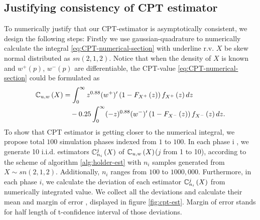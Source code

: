 \subsection{Justifying consistency of CPT estimator}
To numerically justify that our CPT-estimator is asymptotically consistent, we design the following steps:
Firstly we use gaussian-quadrature to numerically calculate the integral \eqref{eq:CPT-numerical-section} with underline r.v. $X$ be skew normal distributed as $sn(2,1,2)$. Notice that when the density of $X$ is known and $w^+(p)$, $w^-(p)$ are differentiable, the CPT-value \eqref{eq:CPT-numerical-section} could be formulated as
\begin{align}
\mathbb{C}_{u,w}\left( X \right) & = \int_0^{\infty} z^{0.88} (w^{+})^\prime \left(1 - F_{X^+}\left(z\right)\right) f_{X^+}\left(z\right)dz \\
&\quad - 0.25 \int_0^{\infty} (-z)^{0.88} (w^{-})^\prime \left(1 - F_{X^-}\left(z\right)\right) f_{X^-}\left(z\right) dz.
\end{align}
To show that CPT estimator is getting closer to the numerical integral, we propose total $100$ simulation phases indexed from $1$ to $100$. In each phase i , we generate 10 i.i.d. estimators $\mathbb{C}^j_{n_i}\left(X\right)$ of $\mathbb{C}_{u,w}\left( X\right)$($j$ from 1 to 10), according to the scheme of algorithm \ref{alg:holder-est} with $n_i$ samples generated from $X \sim sn(2,1,2)$. Additionally, $n_i$ ranges from $100$ to $1000,000$. Furthermore, in each phase $i$, we calculate the deviation of each estimator $\mathbb{C}^j_{n_i}\left(X\right)$ from numerically integrated value. We collect all the deviations and calculate their mean and margin of error , displayed in figure \ref{fig:cpt-est}. Margin of error stands for half length of t-confidence interval of those deviations.

\newcommand{\errorband}[5][]{ %
\pgfplotstableread[col sep=tab, skip first n=2]{#2}\datatable
    \addplot [draw=none, stack plots=y, forget plot] table [
        x={#3},
        y expr=\thisrow{#4}-2*\thisrow{#5}
    ] {\datatable};

    \addplot [draw=none, fill=gray!40, stack plots=y, area legend, #1] table [
        x={#3},
        y expr=4*\thisrow{#5}
    ] {\datatable} \closedcycle;

    \addplot [forget plot, stack plots=y,draw=none] table [x={#3}, y expr=-(\thisrow{#4}+2*\thisrow{#5})] {\datatable};
}

